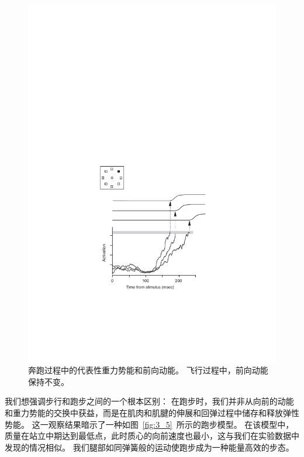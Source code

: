 \begin{figure}[!htb]
	\centering
	\includegraphics[width=1.0\linewidth]{chap3/3_4}
	\caption{奔跑过程中的代表性重力势能和前向动能。
		飞行过程中，前向动能保持不变\cite{yong2014differences}。 \label{fig:3_4}}
\end{figure}


我们想强调步行和跑步之间的一个根本区别：
在跑步时，我们并非从向前的动能和重力势能的交换中获益，而是在肌肉和肌腱的伸展和回弹过程中储存和释放弹性势能。
这一观察结果暗示了一种如图~\ref{fig:3_5}~所示的跑步模型。
在该模型中，质量在站立中期达到最低点，此时质心的向前速度也最小，这与我们在实验数据中发现的情况相似。
我们腿部如同弹簧般的运动使跑步成为一种能量高效的步态。

